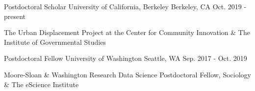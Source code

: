 

\begin{cventries}

  \cventry
    {Postdoctoral Scholar} %
    {University of California, Berkeley} %
    {Berkeley, CA} %
    {Oct. 2019 - present} %
    {
      \begin{cvitems} %
        The Urban Displacement Project at the Center for Community Innovation \& The Institute of Governmental Studies
      \end{cvitems}
    }

  \cventry
    {Postdoctoral Fellow} %
    {University of Washington} %
    {Seattle, WA} %
    {Sep. 2017 - Oct. 2019} %
    {
      \begin{cvitems} %
        Moore-Sloan \& Washington Research Data Science Postdoctoral Fellow, Sociology \& The eScience Institute
      \end{cvitems}
    }

\end{cventries}
